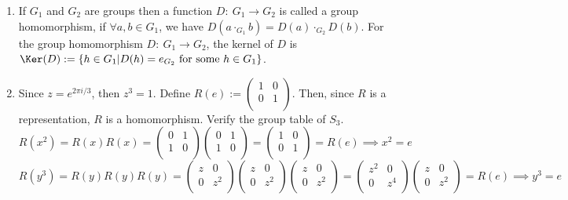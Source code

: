 \documentclass[a4paper]{article}
\begin{document}
\begin{ans}\leavevmode
\begin{enumerate}[label=(\roman*)]
\item If $G_1$ and $G_2$ are groups then a function $D:~ G_1\rightarrow G_2$ is called a group homomorphism, if $\forall a,b\in G_1$, we have $D(a\cdot_{G_1} b)=D(a)\cdot_{G_2}D(b)$. For the group homomorphism $D:~G_1\rightarrow G_2$, the kernel of $D$ is $\Ker(D):=\{h\in G_1|D(h)=e_{G_2}\text{  for some } h\in G_1\}$.
\item Since $z=e^{2\pi i/3}$, then $z^3=1$. Define $R(e):=\begin{pmatrix}1&0\\0&1\\\end{pmatrix}$. Then, since $R$ is a representation, $R$ is a homomorphism. Verify the group table of $S_3$.
$$R(x^2)=R(x)R(x)=\begin{pmatrix}0&1\\1&0\\\end{pmatrix}\begin{pmatrix}0&1\\1&0\\\end{pmatrix}=\begin{pmatrix}1&0\\0&1\\\end{pmatrix}=R(e)\implies x^2=e$$
$$R(y^3)=R(y)R(y)R(y)=\begin{pmatrix}z&0\\0&z^2\\\end{pmatrix}\begin{pmatrix}z&0\\0&z^2\\\end{pmatrix}\begin{pmatrix}z&0\\0&z^2\\\end{pmatrix}=\begin{pmatrix}z^2&0\\0&z^4\\\end{pmatrix}\begin{pmatrix}z&0\\0&z^2\\\end{pmatrix}=R(e)\implies y^3=e$$

\end{enumerate}
\end{ans}
\end{document}
